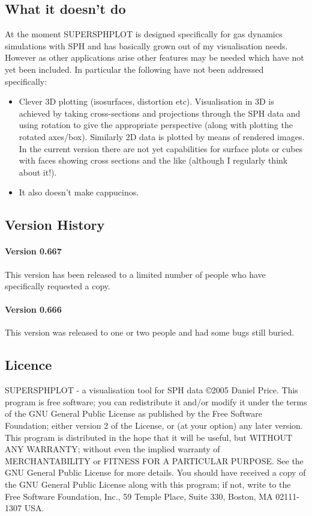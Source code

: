 \documentclass[a4paper,12pt]{article}
\begin{document}
\subsection{What it doesn't do}
At the moment SUPERSPHPLOT is designed specifically for gas dynamics
simulations with SPH and has basically grown out of my visualisation needs.
However as other applications arise other features may be needed which have not
yet been included. In particular the following have not been addressed
specifically:
\begin{itemize}
\item Clever 3D plotting (isosurfaces, distortion etc). Visualisation in 3D is achieved by taking cross-sections and projections through the SPH data and using rotation to give the appropriate perspective (along with plotting the rotated axes/box). Similarly 2D data is plotted by means of
rendered images. In the current version there are not yet capabilities for surface plots or cubes
with faces showing cross sections and the like (although I regularly think about it!).
\item It also doesn't make cappucinos.
\end{itemize}

\subsection{Version History}

\paragraph{Version 0.667}
 This version has been released to a limited number of people who have specifically requested a copy.
\paragraph{Version 0.666}
 This version was released to one or two people and had some bugs still buried.

\subsection{Licence}
SUPERSPHPLOT - a visualisation tool for SPH data \copyright 2005 Daniel Price.
 This program is free software; you can redistribute it and/or modify it under the terms of the GNU General Public License as published by the Free Software Foundation; either version 2 of the License, or (at your option) any later version. This program is distributed in the hope that it will be useful, but WITHOUT ANY WARRANTY; without even the implied warranty of MERCHANTABILITY or FITNESS FOR A PARTICULAR PURPOSE.  See the GNU General Public License for more details. You should have received a copy of the GNU General Public License along with this program; if not, write to the Free Software Foundation, Inc., 59 Temple Place, Suite 330, Boston, MA  02111-1307  USA.
\end{document}
